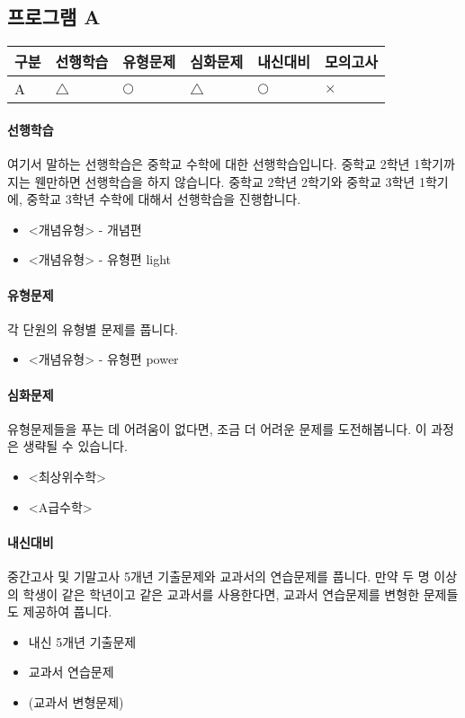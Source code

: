 \documentclass{oblivoir}
\begin{document}
\newpage
%
\subsection{프로그램 A}
\begin{center}
\centering\small
\begin{tabu}[t]{|X[c]|X[c]X[c]X[c]X[c]X[c]|}
\hline
구분	&선행학습	&유형문제	&심화문제	&내신대비	&모의고사\\\hline
A	&\(\triangle\)	&\(\bigcirc\)	&\(\triangle\)	&\(\bigcirc\)	&\(\times\)\\\hline
\end{tabu}
\end{center}
\paragraph{선행학습}
여기서 말하는 선행학습은 중학교 수학에 대한 선행학습입니다.
중학교 2학년 1학기까지는 웬만하면 선행학습을 하지 않습니다.
중학교 2학년 2학기와 중학교 3학년 1학기에, 중학교 3학년 수학에 대해서 선행학습을 진행합니다.
\begin{itemize}
\item
<개념유형> - 개념편
\item
<개념유형> - 유형편 light
\end{itemize}
\paragraph{유형문제}
각 단원의 유형별 문제를 풉니다.
\begin{itemize}
\item
<개념유형> - 유형편 power
\end{itemize}
\paragraph{심화문제}
유형문제들을 푸는 데 어려움이 없다면, 조금 더 어려운 문제를 도전해봅니다.
이 과정은 생략될 수 있습니다.
\begin{itemize}
\item
<최상위수학>
\item
<A급수학>
\end{itemize}

\paragraph{내신대비}
중간고사 및 기말고사 5개년 기출문제와 교과서의 연습문제를 풉니다.
만약 두 명 이상의 학생이 같은 학년이고 같은 교과서를 사용한다면, 교과서 연습문제를 변형한 문제들도 제공하여 풉니다.
\begin{itemize}
\item
내신 5개년 기출문제
\item
교과서 연습문제
\item
(교과서 변형문제)
\end{itemize}
\end{document}
